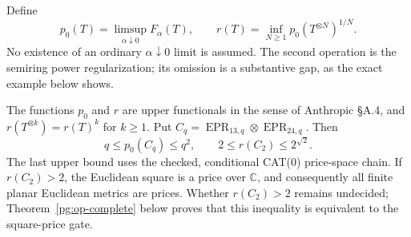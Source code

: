 Define
\[
 p_0(T)=\limsup_{\alpha\downarrow0}F_\alpha(T),\qquad
 r(T)=\inf_{N\geq1}p_0(T^{\otimes N})^{1/N}.
 \tag{PG-OP-regularization}
\]
No existence of an ordinary $\alpha\downarrow0$ limit is assumed.
The second operation is the semiring power regularization; its
omission is a substantive gap, as the exact example below shows.

\begin{proposition}[PG-OP-GATE]
\label{pg:op-gate}
The functions $p_0$ and $r$ are upper functionals in the sense of
Anthropic \S A.4, and $r(T^{\otimes k})=r(T)^k$ for $k\geq1$.
Put $C_q=\operatorname{EPR}_{13,q}\otimes
\operatorname{EPR}_{24,q}$. Then
\[
 q\leq p_0(C_q)\leq q^2,\qquad
 2\leq r(C_2)\leq2^{\sqrt2}.
 \tag{PG-OP-bounds}
\]
The last upper bound uses the checked, conditional CAT(0) price-space
chain. If $r(C_2)>2$, the Euclidean square is a price over
$\mathbb C$, and consequently all finite planar Euclidean metrics
are prices. Whether $r(C_2)>2$ remains undecided; Theorem~\ref{pg:op-complete}
below proves that this inequality is equivalent to the square-price gate.
\end{proposition}
